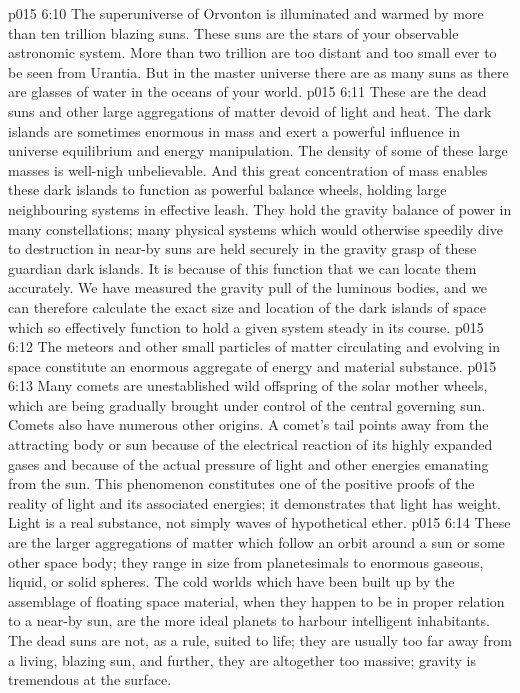 \vs p015 6:10 The superuniverse of Orvonton is illuminated and warmed by more than ten trillion blazing suns. These suns are the stars of your observable astronomic system. More than two trillion are too distant and too small ever to be seen from Urantia. But in the master universe there are as many suns as there are glasses of water in the oceans of your world.
\vs p015 6:11 \pc {} These are the dead suns and other large aggregations of matter devoid of light and heat. The dark islands are sometimes enormous in mass and exert a powerful influence in universe equilibrium and energy manipulation. The density of some of these large masses is well\hyp{}nigh unbelievable. And this great concentration of mass enables these dark islands to function as powerful balance wheels, holding large neighbouring systems in effective leash. They hold the gravity balance of power in many constellations; many physical systems which would otherwise speedily dive to destruction in near\hyp{}by suns are held securely in the gravity grasp of these guardian dark islands. It is because of this function that we can locate them accurately. We have measured the gravity pull of the luminous bodies, and we can therefore calculate the exact size and location of the dark islands of space which so effectively function to hold a given system steady in its course.
\vs p015 6:12 \pc {} The meteors and other small particles of matter circulating and evolving in space constitute an enormous aggregate of energy and material substance.
\vs p015 6:13 Many comets are unestablished wild offspring of the solar mother wheels, which are being gradually brought under control of the central governing sun. Comets also have numerous other origins. A comet’s tail points away from the attracting body or sun because of the electrical reaction of its highly expanded gases and because of the actual pressure of light and other energies emanating from the sun. This phenomenon constitutes one of the positive proofs of the reality of light and its associated energies; it demonstrates that light has weight. Light is a real substance, not simply waves of hypothetical ether.
\vs p015 6:14 \pc {} These are the larger aggregations of matter which follow an orbit around a sun or some other space body; they range in size from planetesimals to enormous gaseous, liquid, or solid spheres. The cold worlds which have been built up by the assemblage of floating space material, when they happen to be in proper relation to a near\hyp{}by sun, are the more ideal planets to harbour intelligent inhabitants. The dead suns are not, as a rule, suited to life; they are usually too far away from a living, blazing sun, and further, they are altogether too massive; gravity is tremendous at the surface.
